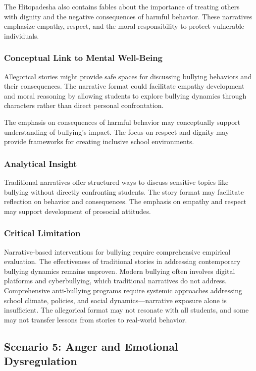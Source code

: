 \documentclass[12pt,a4paper,twocolumn]{article}
\begin{document}
The Hitopadesha also contains fables about the importance of treating others with dignity and the negative consequences of harmful behavior. These narratives emphasize empathy, respect, and the moral responsibility to protect vulnerable individuals.

\subsubsection{Conceptual Link to Mental Well-Being}

Allegorical stories might provide safe spaces for discussing bullying behaviors and their consequences. The narrative format could facilitate empathy development and moral reasoning by allowing students to explore bullying dynamics through characters rather than direct personal confrontation.

The emphasis on consequences of harmful behavior may conceptually support understanding of bullying's impact. The focus on respect and dignity may provide frameworks for creating inclusive school environments.

\subsubsection{Analytical Insight}

Traditional narratives offer structured ways to discuss sensitive topics like bullying without directly confronting students. The story format may facilitate reflection on behavior and consequences. The emphasis on empathy and respect may support development of prosocial attitudes.

\subsubsection{Critical Limitation}

Narrative-based interventions for bullying require comprehensive empirical evaluation. The effectiveness of traditional stories in addressing contemporary bullying dynamics remains unproven. Modern bullying often involves digital platforms and cyberbullying, which traditional narratives do not address. Comprehensive anti-bullying programs require systemic approaches addressing school climate, policies, and social dynamics—narrative exposure alone is insufficient. The allegorical format may not resonate with all students, and some may not transfer lessons from stories to real-world behavior.

\subsection{Scenario 5: Anger and Emotional Dysregulation}
\end{document}
